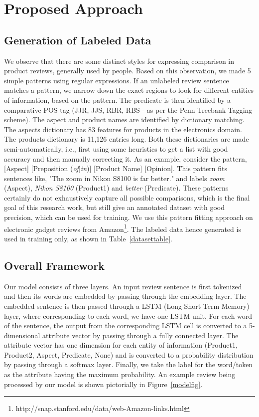 \section{Proposed Approach}

\subsection{Generation of Labeled Data}
We observe that there are some distinct styles for expressing comparison in product reviews, generally used by people. Based on this observation, we made 5 simple patterns using regular expressions. If an unlabeled review sentence matches a pattern, we narrow down the exact regions to look for different entities of information, based on the pattern. The predicate is then identified by a comparative POS tag (JJR, JJS, RBR, RBS - as per the Penn Treebank Tagging scheme). The aspect and product names are identified by dictionary matching. The aspects dictionary has 83 features for products in the electronics domain. The products dictionary is 11,126 entries long. Both these dictionaries are made semi-automatically, i.e., first using some heuristics to get a list with good accuracy and then manually correcting it. As an example, consider the pattern, [Aspect] [Preposition (\emph{of}|\emph{in})] [Product Name] [Opinion]. This pattern fits sentences like, "The zoom in Nikon S8100 is far better." and labels \emph{zoom} (Aspect), \emph{Nikon S8100} (Product1) and \emph{better} (Predicate). These patterns certainly do not exhaustively capture all possible comparisons, which is the final goal of this research work, but still give an annotated dataset with good precision, which can be used for training. We use this pattern fitting approach on electronic gadget reviews \cite{mcauley2013hidden} from Amazon\footnote{http://snap.stanford.edu/data/web-Amazon-links.html}. The labeled data hence generated is used in training only, as shown in Table~\ref{datasettable}. 

\subsection{Overall Framework}
Our model consists of three layers. An input review sentence is first tokenized and then its words are embedded by passing through the embedding layer. The embedded sentence is then passed through a LSTM (Long Short Term Memory) layer, where corresponding to each word, we have one LSTM unit. For each word of the sentence, the output from the corresponding LSTM cell is converted to a 5-dimensional attribute vector by passing through a fully connected layer. The attribute vector has one dimension for each entity of information (Product1, Product2, Aspect, Predicate, None) and is converted to a probability distribution by passing through a softmax layer. Finally, we take the label for the word/token as the attribute having the maximum probability. An example review being processed by our model is shown pictorially in Figure~\ref{modelfig}.

